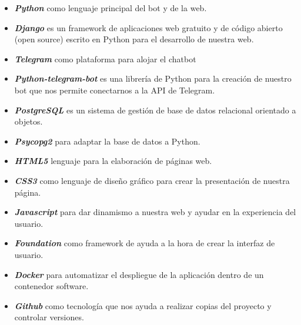\begin{itemize}
\item \textit{\textbf{Python}} como lenguaje principal del bot y de la web.
\item \textit{\textbf{Django}} es un framework de aplicaciones web gratuito y de código abierto (open source) escrito en Python para el desarrollo de nuestra web.
\item \textit{\textbf{Telegram}} como plataforma para alojar el chatbot
\item \textit{\textbf{Python-telegram-bot}} es una librería de Python para la creación de nuestro bot que nos permite conectarnos a la API de Telegram.
\item \textit{\textbf{PostgreSQL}} es un sistema de gestión de base de datos relacional orientado a objetos.
\item \textit{\textbf{Psycopg2}} para adaptar la base de datos a Python.
\item \textit{\textbf{HTML5}} lenguaje para la elaboración de páginas web.
\item \textit{\textbf{CSS3}} como lenguaje de diseño gráfico para crear la presentación de nuestra página.
\item \textit{\textbf{Javascript}} para dar dinamismo a nuestra web y ayudar en la experiencia del usuario.
\item \textit{\textbf{Foundation}} como framework de ayuda a la hora de crear la interfaz de usuario.
\item \textit{\textbf{Docker}} para automatizar el despliegue de la aplicación dentro de un contenedor software.
\item \textit{\textbf{Github}} como tecnología que nos ayuda a realizar copias del proyecto y controlar versiones.
\end{itemize}
